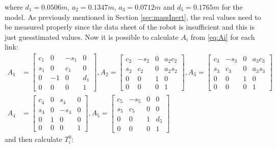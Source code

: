 where $d_1 = 0.0506m$, $a_2 = 0.1347m$, $a_3 = 0.0712m$ and $d_5 = 0.1765m$ for the model. As previously mentioned in Section \ref{sec:massInert}, the real values need to be measured properly since the data sheet of the robot is insufficient and this is just guesstimated values\cite{Crustcrawler}. 
Now it is possible to calculate $A_i$ from \eqref{eq:Ai} for each link: 
\begin{align*}
A_1 &= \begin{bmatrix} 
            c_1 & 0 & -s_1 & 0\\
            s_1 & 0 & c_1 & 0\\
            0 & -1 & 0 & d_1\\
            0 & 0 & 0 & 1
        \end{bmatrix},
A_2 = \begin{bmatrix} 
            c_2 & -s_2 & 0 & a_2c_2\\
            s_2 & c_2 & 0 & a_2s_2\\
            0 & 0 & 1 & 0\\
            0 & 0 & 0 & 1
        \end{bmatrix},
A_3 = \begin{bmatrix} 
            c_3 & -s_3 & 0 & a_3c_3\\
            s_3 & c_3 & 0 & a_3s_3\\
            0 & 0 & 1 & 0\\
            0 & 0 & 0 & 1
        \end{bmatrix}\\
A_4 &= \begin{bmatrix} 
            c_4 & 0 & s_4 & 0\\
            s_4 & 0 & -s_4 & 0\\
            0 & 1 & 0 & 0\\
            0 & 0 & 0 & 1
        \end{bmatrix},
A_5 = \begin{bmatrix} 
            c_5 & -s_5 & 0 & 0\\
            s_5 & c_5 & 0 & 0\\
            0 & 0 & 1 & d_5 \\
            0 & 0 & 0 & 1
        \end{bmatrix}
\end{align*}
 and then calculate $T_i^0$:
